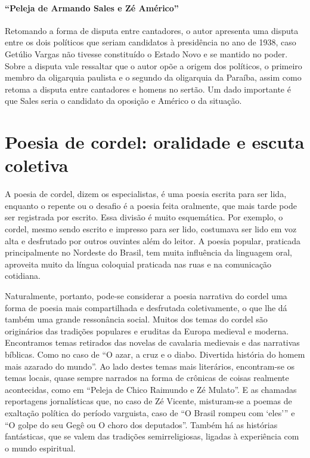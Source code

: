 \paragraph{``Peleja de Armando Sales e Zé Américo''}

Retomando a forma de disputa entre cantadores, o autor apresenta uma
disputa entre os dois políticos que seriam candidatos à presidência no
ano de 1938, caso Getúlio Vargas não tivesse constituído o Estado Novo
e se mantido no poder. Sobre a disputa vale ressaltar que o autor opõe
a origem dos políticos, o primeiro membro da oligarquia paulista e o
segundo da oligarquia da Paraíba, assim como retoma a disputa entre
cantadores e homens no sertão. Um dado importante é que Sales seria o
candidato da oposição e Américo o da situação. 


\bigskip

\section{Poesia de cordel: oralidade e escuta coletiva}

A poesia de cordel, dizem os especialistas, é uma poesia escrita para
ser lida, enquanto o repente ou o desafio é a poesia feita oralmente,
que mais tarde pode ser registrada por escrito. Essa divisão é muito
esquemática. Por exemplo, o cordel, mesmo sendo escrito e impresso para
ser lido, costumava ser lido em voz alta e desfrutado por outros
ouvintes além do leitor. A poesia popular, praticada principalmente no
Nordeste do Brasil, tem muita influência da linguagem oral, aproveita
muito da língua coloquial praticada nas ruas e na comunicação
cotidiana. 

Naturalmente, portanto, pode-se considerar a poesia narrativa do cordel
uma forma de poesia mais compartilhada e desfrutada coletivamente, o
que lhe dá também uma grande ressonância social. Muitos dos temas do
cordel são originários das tradições populares e eruditas da Europa
medieval e moderna. Encontramos temas retirados das novelas de
cavalaria medievais e das narrativas bíblicas. Como no caso de
``O azar, a cruz e o diabo. Divertida história do
homem mais azarado do mundo''. Ao lado destes temas
mais literários, encontram-se os temas locais, quase sempre narrados na
forma de crônicas de coisas realmente acontecidas, como em
``Peleja de Chico Raimundo e Zé
Mulato''. E as chamadas reportagens jornalísticas que,
no caso de Zé Vicente, misturam-se a poemas de exaltação política do
período varguista, caso de ``O Brasil rompeu com
`eles''' e ``O golpe do seu Gegê ou O choro dos
deputados''. Também há as histórias fantásticas, que
se valem das tradições semirreligiosas, ligadas à experiência com o
mundo espiritual. 

